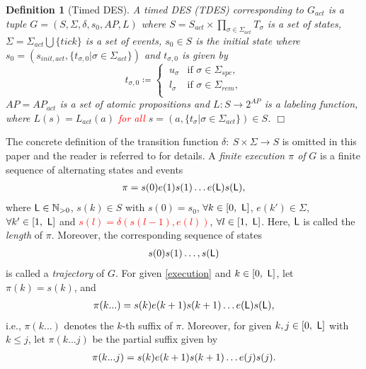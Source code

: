 \documentclass[journal,twoside,web]{IEEEtran}
\newcommand{\qedwhite}{\hfill \ensuremath{\Box}}
\newtheorem{dfn}{Definition}
\newcommand{\req}[1]{\eqref{#1}}
\newcommand{\Len}{{\sf L}}
\newcommand{\red}[1]{\textcolor{red}{#1}}
\begin{document}
\begin{dfn}[Timed DES]\label{def:G}
A timed DES (TDES) corresponding to $G_{act}$ is a tuple $G=(S, \Sigma, \delta, s_0,AP, L)$ where $S = S_{act} \times \prod_{\sigma\in \Sigma_{act}} T_{\sigma}$ is a set of states, $\Sigma= \Sigma_{act} \bigcup \{\textit{tick}\}$ is a set of events, $s_0 \in S$ is the initial state where $s_0 = (s_{init,act}, \{ t_{\sigma,0} | \sigma \in \Sigma_{act} \})$ and $t_{\sigma,0}$ is given by
					\begin{equation}
						t_{\sigma, 0} \coloneqq \left\{
						\begin{array}{ll}  
							\ u_{\sigma}  & \mbox{if } {\sigma} \in \Sigma_{spe}, \\
							\ l_{\sigma} & \mbox{if } {\sigma } \in \Sigma_{rem}, \\
						\end{array} \right.
					\end{equation}	
$AP = AP_{act} $ is a set of  atomic propositions and $L  : S \rightarrow 2^{AP} $ is a labeling function, where $L(s)=L_{act}(a)$ \red{for all} $s = (a, \{ t_\sigma | \sigma \in \Sigma_{act} \}) \in S$. \qedwhite \end{dfn}
%
The concrete definition of the transition function $\delta:~S\times \Sigma \to S$ is omitted in this paper and the reader is referred to \cite{BW1994} for details.
%
%
%
%
A \textit{finite execution $\pi$ of} $G$ is a finite sequence of alternating states and events
\begin{align}\label{execution}
\pi = s(0)e(1)s(1)\ldots e(\Len) s(\Len), 
\end{align}
where $\Len \in \mathbb{N}_{> 0}$, 
$s(k) \in S$ with $s(0) = s_0$, $\forall k\in[0,\ \Len]$, $e(k') \in \Sigma$, $\forall k' \in [1,\ \Len]$ and \red{$s(l)= \delta(s({l-1}), e({l}))$}, $\forall l\in [1,\ \Len]$. 
Here, $\Len$ is called the \textit{length} of $\pi$.
Moreover, the corresponding sequence of states 
\begin{align}
s(0) s(1) \ldots, s(\Len) \notag
\end{align}
is called a \textit{trajectory} of $G$. 
For given \req{execution} and $k\in[0,\ \Len]$, let $\pi(k) = s(k)$, and 
\begin{align}
\pi(k...) = s(k) e({k+1}) s({k+1}) \ldots e({\Len}) s({\Len}), \notag 
\end{align}
i.e., $\pi(k...)$ denotes the $k$-th suffix of $\pi$. Moreover, for given $k, j\in[0,\ \Len]$ with $k\leq j$, let $\pi(k...j)$ be the partial suffix given by 
\begin{align}
\pi(k...j) = s(k) e({k+1}) s({k+1}) \ldots e({j}) s({j}). \notag 
\end{align}
\end{document}
